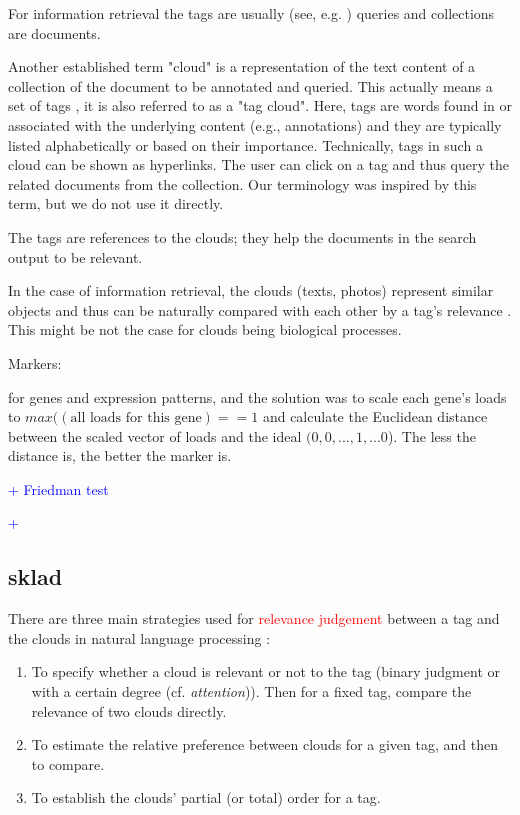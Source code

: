 \documentclass{llncs}
\begin{document}
For information retrieval the tags are usually (see, e.g. \cite{liu2009learning}) queries and collections are documents. 

Another established term "cloud" is a representation of the text content of a collection of the document to be annotated and queried. This actually means a set of tags \cite{venetis2011selection}, it is also referred to as a "tag cloud". Here, tags are words found in or associated with the underlying content (e.g., annotations) and they are typically listed alphabetically or based on their importance. Technically, tags in such a cloud can be shown as hyperlinks. The user can click on a tag and thus query the related documents from the collection. Our terminology was inspired by this term, but we do not use it directly.

The tags are references to the clouds; they help the documents in the search output to be relevant. 

In the case of information retrieval, the clouds (texts, photos) represent similar objects and thus can be naturally compared with each other by a tag's relevance \cite{liu2009learning}. This might be not the case for clouds being biological processes.




Markers: \cite{stein-obrien_patternmarkers_2017}


 \cite{stein-obrien_patternmarkers_2017} for genes and expression patterns, and the solution was to scale each gene's loads to $max((\mbox{all loads for this gene})==1$ and calculate the Euclidean distance between the scaled vector of loads and the ideal $(0,0,...,1,...0$). The less the distance is, the better the marker is. 

\textcolor{blue}{+ Friedman test }

\textcolor{blue}{+ \cite{Gut:2009}}

\subsection{sklad}


There are three main strategies used for  \textcolor{red}{relevance judgement} between a tag and the clouds in natural language processing \cite{liu2009learning}: 
\begin{enumerate}
    \item To specify whether a cloud is relevant or not to the tag
(binary judgment or with a certain degree (cf. \textit{attention})).
Then for a fixed tag, compare the relevance of two clouds directly.
\item To estimate the relative preference between clouds for a given tag, and then to compare.
\item To establish the clouds' partial (or total) order for a tag.
\end{enumerate}
\end{document}
